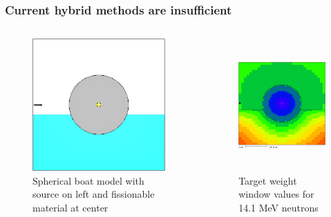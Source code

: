 \documentclass[xcolor=x11names,compress]{beamer}
\renewcommand{\(}{\begin{columns}}
\renewcommand{\)}{\end{columns}}
\newcommand{\<}[1]{\begin{column}{#1}}
\renewcommand{\>}{\end{column}}
\begin{document}
\begin{frame}[fragile]
  \frametitle{Current hybrid methods are insufficient}

	\begin{columns}
  	\begin{column}{0.5\textwidth}
 	 \begin{center}
 	 \begin{figure}
 	 \includegraphics[height=2in,clip]{boat-interrogation}  
 	 \caption{Spherical boat model with source on left and fissionable material at center}
 	 \end{figure}
 	 \end{center}
  	\end{column}
 	\begin{column}{0.5\textwidth}
 	 \begin{center}
 	 \begin{figure}
 	 \includegraphics[height=2in,clip]{boat-map}  
 	 \caption{Target weight window values for 14.1 MeV neutrons}
 	 \end{figure}
 	 \end{center}
  	\end{column}
	\end{columns}

\end{frame}
\end{document}
